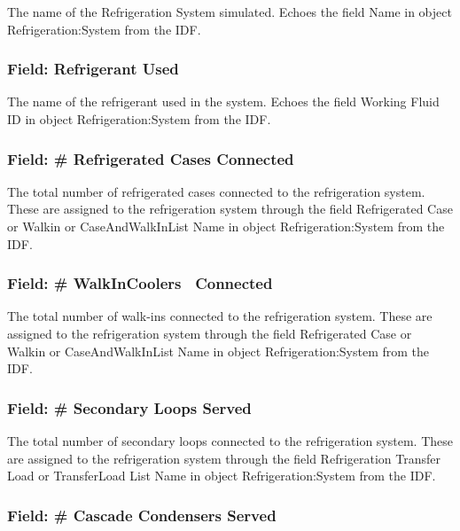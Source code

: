 The name of the Refrigeration System simulated. Echoes the field Name in object Refrigeration:System from the IDF.

\subsubsection{Field: Refrigerant Used}\label{field-refrigerant-used}

The name of the refrigerant used in the system. Echoes the field Working Fluid ID in object Refrigeration:System from the IDF.

\subsubsection{Field: \# Refrigerated Cases Connected}\label{field-refrigerated-cases-connected-1}

The total number of refrigerated cases connected to the refrigeration system. These are assigned to the refrigeration system through the field Refrigerated Case or Walkin or CaseAndWalkInList Name in object Refrigeration:System from the IDF.

\subsubsection{Field: \# WalkInCoolers~ Connected}\label{field-walkincoolers-connected-1}

The total number of walk-ins connected to the refrigeration system. These are assigned to the refrigeration system through the field Refrigerated Case or Walkin or CaseAndWalkInList Name in object Refrigeration:System from the IDF.

\subsubsection{Field: \# Secondary Loops Served}\label{field-secondary-loops-served}

The total number of secondary loops connected to the refrigeration system. These are assigned to the refrigeration system through the field Refrigeration Transfer Load or TransferLoad List Name in object Refrigeration:System from the IDF.

\subsubsection{Field: \# Cascade Condensers Served}\label{field-cascade-condensers-served}

